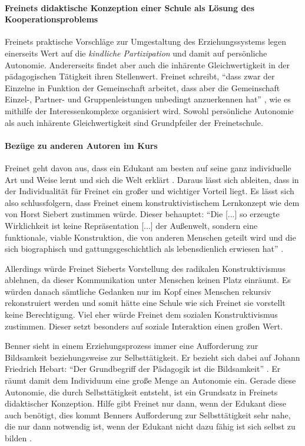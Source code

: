 \paragraph{Freinets didaktische Konzeption einer Schule als Lösung des Kooperationsproblems}
Freinets praktische Vorschläge zur Umgestaltung des Erziehungssystems legen einerseits Wert auf die \emph{kindliche Partizipation} und damit auf persönliche Autonomie.
Andererseits findet aber auch die inhärente Gleichwertigkeit in der pädagogischen Tätigkeit ihren Stellenwert.
Freinet schreibt, ``dass zwar der Einzelne in Funktion der Gemeinschaft arbeitet, dass aber die Gemeinschaft Einzel-, Partner- und Gruppenleistungen unbedingt anzuerkennen hat'' \parencite[87]{Freinet1979}, wie es mithilfe der Interessenkomplexe organisiert wird.
Sowohl persönliche Autonomie als auch inhärente Gleichwertigkeit sind Grundpfeiler der Freinetschule.

\paragraph{Bezüge zu anderen Autoren im Kurs}

Freinet geht davon aus, dass ein Edukant am besten auf seine ganz individuelle Art und Weise lernt und sich die Welt erklärt \parencite[vgl.][~496]{Freinet-2000a}.
Daraus lässt sich ableiten, dass in der Individualität für Freinet ein großer und wichtiger Vorteil liegt.
Es lässt sich also schlussfolgern, dass Freinet einem konstruktivistischem Lernkonzept wie dem von Horst Siebert zustimmen würde.
Dieser behauptet: ``Die [...] so erzeugte Wirklichkeit ist keine Repräsentation [...] der Außenwelt, sondern eine funktionale, viable Konstruktion, die von anderen Menschen geteilt wird und die sich biographisch und gattungsgeschichtlich als lebensdienlich erwiesen hat'' \parencite[~6]{siebert-2003}.

Allerdings würde Freinet Sieberts Vorstellung des radikalen Konstruktivismus ablehnen, da dieser Kommunikation unter Menschen keinen Platz einräumt.
Es würden danach sämtliche Gedanken nur im Kopf eines Menschen rekursiv rekonstruiert werden \parencite[vgl.][~10]{siebert-2003} und somit hätte eine Schule wie sich Freinet sie vorstellt keine Berechtigung.
Viel eher würde Freinet dem sozialen Konstruktivismus zustimmen.
Dieser setzt besonders auf soziale Interaktion einen großen Wert.


Benner sieht in einem Erziehungsprozess immer eine Aufforderung zur Bildsamkeit beziehungsweise zur Selbsttätigkeit.
Er bezieht sich dabei auf Johann Friedrich Hebart:
``Der Grundbegriff der Pädagogik ist die Bildsamkeit'' \parencite[~70]{benner-2012}.
Er räumt damit dem Individuum eine große Menge an Autonomie ein.
Gerade diese Autonomie, die durch Selbsttätigkeit entsteht, ist ein Grundsatz in Freinets didaktischer Konzeption.
Hilfe gibt Freinet nur dann, wenn der Edukant diese auch benötigt, dies kommt Benners Aufforderung zur Selbsttätigkeit sehr nahe, die nur dann notwendig ist, wenn der Edukant nicht dazu fähig ist sich selbst zu bilden \parencite[vgl.][~91]{benner-2012}.


